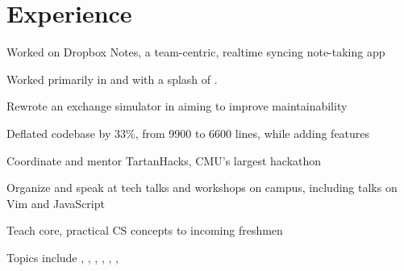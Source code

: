 \documentclass[hidelinks]{deedy-resume-openfont}
\begin{document}
\begin{minipage}[t]{0.66\textwidth}


\section{Experience}

\vspace{\topsep} %
\begin{tightemize}
\item Worked on Dropbox Notes, a team-centric, realtime syncing note-taking app
\item Worked primarily in  and  with a
  splash of .
\end{tightemize}
\sectionsep

\begin{tightemize}
\item Rewrote an exchange simulator in  aiming to improve
  maintainability
\item Deflated codebase by 33\%, from 9900 to 6600 lines, while adding features
\end{tightemize}
\sectionsep

\begin{tightemize}
\item Coordinate and mentor TartanHacks, CMU's largest hackathon
\item Organize and speak at tech talks and workshops on campus, including talks
  on Vim and JavaScript
\end{tightemize}
\sectionsep

\begin{tightemize}
\item Teach core, practical CS concepts to incoming freshmen
\item Topics include , ,
  , , , ,
\end{tightemize}
\sectionsep


\end{minipage}
\end{document}
